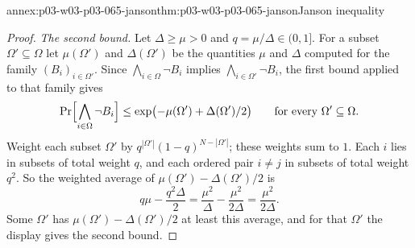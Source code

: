 \begin{annexitem}{annex:p03-w03-p03-065-janson}{thm:p03-w03-p03-065-janson}{Janson inequality}
\begin{proof}
\emph{The second bound.}  Let \(\Delta\geq\mu>0\) and \(q=\mu/\Delta\in
(0,1]\).  For a subset \(\Omega'\subseteq\Omega\) let \(\mu(\Omega')\) and
\(\Delta(\Omega')\) be the quantities \(\mu\) and \(\Delta\) computed for the
family \((B_i)_{i\in\Omega'}\).  Since
\(\bigwedge_{i\in\Omega}\neg B_i\) implies
\(\bigwedge_{i\in\Omega'}\neg B_i\), the first bound applied to that family
gives
\[
  \Pr\Bigl[\bigwedge_{i\in\Omega}\neg B_i\Bigr]
  \leq\exp\bigl(-\mu(\Omega')+\Delta(\Omega')/2\bigr)
  \qquad\text{for every }\Omega'\subseteq\Omega .
\]
Weight each subset \(\Omega'\) by \(q^{|\Omega'|}(1-q)^{N-|\Omega'|}\);
these weights sum to \(1\).  Each \(i\) lies in subsets of total weight
\(q\), and each ordered pair \(i\neq j\) in subsets of total weight \(q^2\).
So the weighted average of \(\mu(\Omega')-\Delta(\Omega')/2\) is
\[
  q\mu-\frac{q^2\Delta}2=\frac{\mu^2}\Delta-\frac{\mu^2}{2\Delta}
  =\frac{\mu^2}{2\Delta}.
\]
Some \(\Omega'\) has \(\mu(\Omega')-\Delta(\Omega')/2\) at least this
average, and for that \(\Omega'\) the display gives the second bound.
\end{proof}
\end{annexitem}


